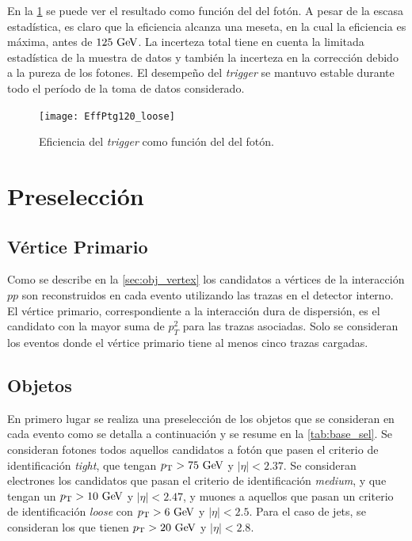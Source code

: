 En la \cref{fig:trigger_perf} se puede ver el resultado como función del {\pt}
del fotón.
A pesar de la escasa estadística, es claro que la eficiencia alcanza una meseta,
en la cual la eficiencia es máxima, antes de $125 \gev$. La incerteza total
tiene en cuenta la limitada estadística de la muestra de datos y también la
incerteza en la corrección debido a la pureza de los fotones. El desempeño del
\emph{trigger} se mantuvo estable durante todo el período de la toma de datos
considerado.

\begin{figure}[!htb]
  \centering

  \texttt{[image: EffPtg120\_loose]}

  \caption{Eficiencia del \emph{trigger} {\trigchain} como función del {\pt} del fotón.}
  \label{fig:trigger_perf}
\end{figure}


\section{Preselección}
\label{sec:base_seleccion}

\subsection{Vértice Primario}

Como se describe en la \cref{sec:obj_vertex} los candidatos a vértices de la interacción $pp$ son
reconstruidos en cada evento utilizando las trazas en el detector interno. El
vértice primario, correspondiente a la interacción dura de dispersión, es el
candidato con la mayor suma de $p_{T}^{2}$ para las trazas asociadas. Solo se
consideran los eventos donde el vértice primario tiene al menos cinco trazas
cargadas.


\subsection{Objetos}
\label{sec:preselection}

En primero lugar se realiza una preselección de los objetos que se consideran en cada
evento como se detalla a continuación y se resume en la \cref{tab:base_sel}. Se
consideran fotones todos aquellos candidatos a fotón que pasen el criterio de
identificación \emph{tight}, que tengan $\pt>75\gev$ y $|\eta|<2.37$. Se
consideran electrones los candidatos que pasan el criterio de identificación \emph{medium}, y
que tengan un $\pt>10\gev$ y $|\eta|<2.47$, y muones a aquellos que pasan un criterio de
identificación \emph{loose} con $\pt>6 \gev$ y $|\eta|<2.5$. Para el caso de
jets, se consideran los que tienen $\pt>20\gev$ y $|\eta|<2.8$.


